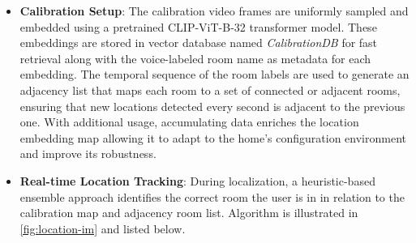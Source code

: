 \begin{itemize}
    \item \textbf{Calibration Setup}: The calibration video frames are uniformly sampled and embedded using a pretrained CLIP-ViT-B-32 transformer model. These embeddings are stored in vector database named \textit{CalibrationDB} for fast retrieval along with the voice-labeled room name as metadata for each embedding. The temporal sequence of the room labels are used to generate an adjacency list that maps each room to a set of connected or adjacent rooms, ensuring that new locations detected every second is adjacent to the previous one. With additional usage, accumulating data enriches the location embedding map allowing it to adapt to the home's configuration environment and improve its robustness.   

    

    \item \textbf{Real-time Location Tracking}: During localization, a heuristic-based ensemble approach identifies the correct room the user is in in relation to the calibration map and adjacency room list. Algorithm is illustrated in \ref{fig:location-im} and listed below.



\end{itemize}
